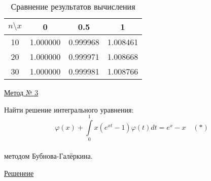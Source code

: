 \documentclass[12pt]{article}
\begin{document}
\renewcommand{\arraystretch}{1.8} %
\renewcommand{\tabcolsep}{0.5cm}   %
\begin{table}[h!]
	\caption{\label{tab:canonsummary} Сравнение результатов вычисления}
	\begin{center}
		\begin{tabular}{|c|c|c|c|}
			\hline
			$ n \setminus x $ & 0 & 0.5 & 1\\
			\hline
			10 & 1.000000 & 0.999968 & 1.008461 \\
			\hline
			20 & 1.000000 & 0.999971 & 1.008668 \\
			\hline
			30 & 1.000000 & 0.999981 & 1.008766 \\
			\hline
		\end{tabular}
	\end{center}
\end{table} 
               
\newpage               
\begin{center}
	\underline{Метод № 3}\\
	\begin{center}
		Найти решение интегрального уравнения:\\
		$$ \varphi(x) + \int\limits_0^1 x(e^{xt}-1)\varphi(t) dt = e^{x} - x  \quad  (\ast)$$\\
		методом Бубнова-Галёркина. 	
	\end{center}	
	\underline{Решенеие}\\
\end{center}
\end{document}
